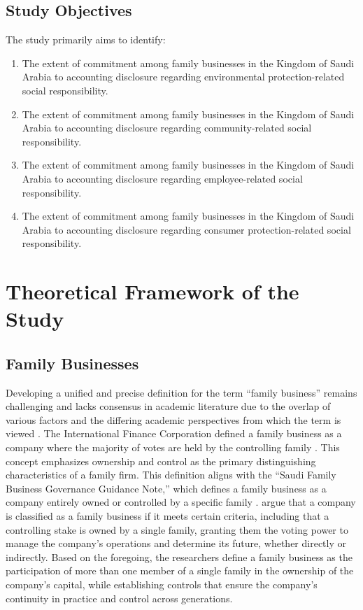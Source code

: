 \documentclass[10pt]{NSP1}
\begin{document}
\subsection{Study Objectives}

The study primarily aims to identify:

\begin{enumerate}
    \item The extent of commitment among family businesses in the Kingdom of Saudi Arabia to accounting disclosure regarding environmental protection-related social responsibility.
    \item The extent of commitment among family businesses in the Kingdom of Saudi Arabia to accounting disclosure regarding community-related social responsibility.
    \item The extent of commitment among family businesses in the Kingdom of Saudi Arabia to accounting disclosure regarding employee-related social responsibility.
    \item The extent of commitment among family businesses in the Kingdom of Saudi Arabia to accounting disclosure regarding consumer protection-related social responsibility.
\end{enumerate}

\section{Theoretical Framework of the Study}

\subsection{Family Businesses}

Developing a unified and precise definition for the term ``family business'' remains challenging and lacks consensus in academic literature due to the overlap of various factors and the differing academic perspectives from which the term is viewed \cite{AlZahrani2023}. The International Finance Corporation defined a family business as a company where the majority of votes are held by the controlling family \cite{IFC2011}. This concept emphasizes ownership and control as the primary distinguishing characteristics of a family firm. This definition aligns with the ``Saudi Family Business Governance Guidance Note,'' which defines a family business as a company entirely owned or controlled by a specific family \cite{SaudiGov2014}. \cite{AlOwais2020} argue that a company is classified as a family business if it meets certain criteria, including that a controlling stake is owned by a single family, granting them the voting power to manage the company's operations and determine its future, whether directly or indirectly. Based on the foregoing, the researchers define a family business as the participation of more than one member of a single family in the ownership of the company's capital, while establishing controls that ensure the company's continuity in practice and control across generations.
\end{document}
